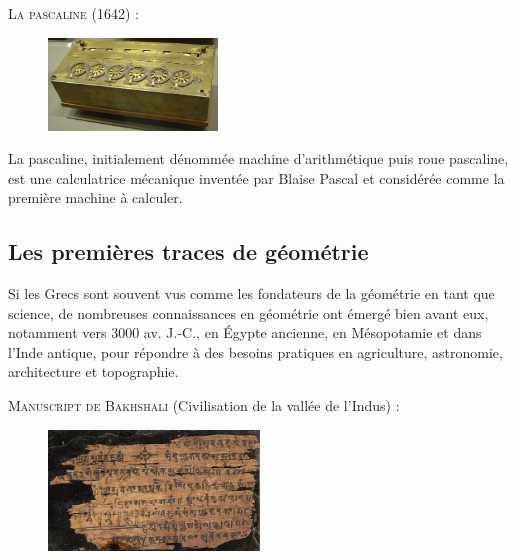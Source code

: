 \textsc{ La pascaline (1642) :} 

\vspace{.35cm}

\begin{figure} %
    \vspace{-0.75cm} %
    \includegraphics[width=0.4\textwidth]{../images/pascaline.jpg}
\end{figure}


La pascaline, initialement dénommée machine d’arithmétique puis roue pascaline, est une calculatrice mécanique inventée par Blaise Pascal et considérée comme la première machine à calculer. 


\newpage

\subsection{Les premières traces de géométrie}

Si les Grecs sont souvent vus comme les fondateurs de la géométrie en tant que science, de nombreuses connaissances en géométrie ont émergé bien avant eux, notamment vers 3000 av. J.-C., en Égypte ancienne, en Mésopotamie et dans l'Inde antique, pour répondre à des besoins pratiques en agriculture, astronomie, architecture et topographie.

\vspace{.5cm}



\textsc{Manuscript de Bakhshali} (Civilisation de la vallée de l'Indus) : 

\vspace{.2cm}

\begin{figure} %
    \vspace{-0.65cm} %
    \includegraphics[width=0.5\textwidth]{../images/Bakhshali_manuscript.jpg}
\end{figure}

